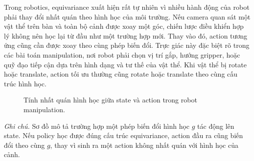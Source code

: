 Trong robotics, equivariance xuất hiện rất tự nhiên vì nhiều hành động của robot phải thay đổi nhất quán theo hình học của môi trường. Nếu camera quan sát một vật thể trên bàn và toàn bộ cảnh được xoay một góc, chiến lược điều khiển hợp lý không nên học lại từ đầu như một trường hợp mới. Thay vào đó, action tương ứng cũng cần được xoay theo cùng phép biến đổi. Trực giác này đặc biệt rõ trong các bài toán manipulation, nơi robot phải chọn vị trí gắp, hướng gripper, hoặc quỹ đạo tiếp cận dựa trên hình dạng và tư thế của vật thể. Khi vật thể bị rotate hoặc translate, action tối ưu thường cũng rotate hoặc translate theo cùng cấu trúc hình học.

\begin{figure}[H]
    \centering
    \caption{Tính nhất quán hình học giữa state và action trong robot manipulation.}
    \label{fig:robotics-equivariance}
\end{figure}

\noindent\textit{Ghi chú.} Sơ đồ mô tả trường hợp một phép biến đổi hình học $g$ tác động lên state. Nếu policy học được đúng cấu trúc equivariance, action đầu ra cũng biến đổi theo cùng $g$, thay vì sinh ra một action không nhất quán với hình học của cảnh.

